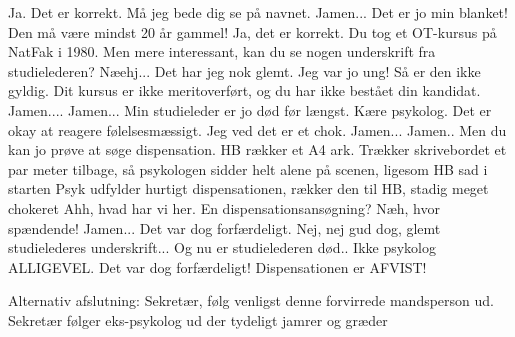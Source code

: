 \documentclass[a4paper,12pt]{article}
\begin{document}
\begin{sketch}
 Ja. Det er korrekt. Må jeg bede dig se på navnet.
 Jamen... Det er jo min blanket! Den må være mindst 20 år gammel!
 Ja, det er korrekt. Du tog et OT-kursus på NatFak i 1980. Men mere interessant, kan du se nogen underskrift fra studielederen?
 Næehj... Det har jeg nok glemt. Jeg var jo ung!
 Så er den ikke gyldig. Dit kursus er ikke meritoverført, og du har ikke bestået din kandidat.
 Jamen.... Jamen... Min studieleder er jo død før længst.
 Kære psykolog. Det er okay at reagere følelsesmæssigt. Jeg ved det er et chok.
 Jamen... Jamen..
 Men du kan jo prøve at søge dispensation.
\scene HB rækker et A4 ark. Trækker skrivebordet et par meter tilbage, så psykologen sidder helt alene på scenen, ligesom HB sad i starten
Psyk udfylder hurtigt dispensationen, rækker den til HB, stadig meget chokeret
 Ahh, hvad har vi her. En dispensationsansøgning? Næh, hvor spændende!
 Jamen... Det var dog forfærdeligt. Nej, nej gud dog, glemt studielederes underskrift... Og nu er studielederen død.. Ikke psykolog ALLIGEVEL. Det var dog forfærdeligt!
 Dispensationen er AFVIST!

Alternativ afslutning:
 Sekretær, følg venligst denne forvirrede mandsperson ud.
\scene Sekretær følger eks-psykolog ud der tydeligt jamrer og græder




\end{sketch}
\end{document}

